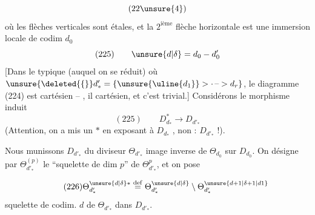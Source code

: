 \[
(22\unsure{4})
\]
où les flèches verticales sont étales,
et la $2^{\mathrm{ième}}$ flèche horizontale est une
immersion locale de codim $d_0$ 
\[
(225)\qquad \unsure{d|\delta}=d_0-d'_0
\]
[Dans le typique (auquel on se réduit)
où $\unsure{\deleted{\{}}d'_* = \{\unsure{\uline{d_1}}>\cdot\,\text{--}>d_r\}$, le diagramme
(224) est cartésien -- , il
  cartésien,  et c'est trivial.]
Considérons le morphisme induit
\[
(225)\qquad D^*_{d_*}\longrightarrow D_{d'_*}
\]
(Attention, on a mis un $*$ en exposant
à $D_{d_*}$ , non : $D_{d'_*}$ !).

Nous munissons $D_{d'_*}$ du diviseur
$\Theta_{d'_*}$ image inverse de $\Theta_{d_0}$ sur $D_{d_0}$.
On désigne par $\Theta_{d'_*}^{(p)}$ le ``squelette
de dim $p$'' de $\Theta_{d'_*}^{p}$, et  on pose

\[
\tag{226}
\Theta_{d'_*}^{\unsure{d|\delta}*}\overset{\mathrm{def}}=
\Theta_{d'_*}^{\unsure{d|\delta}}\setminus
\Theta_{d'_*}^{\unsure{d+1|\delta+1|d1}}
\]
squelette 
de codim. $d$ de
$\Theta_{d'_*}$ dans $D_{d'_*}$.

